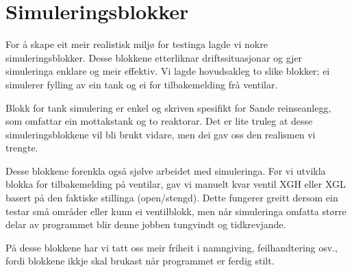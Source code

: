 \section{Simuleringsblokker}
\thispagestyle{fancy}

For å skape eit meir realistisk miljø for testinga lagde vi nokre simuleringsblokker.
Desse blokkene etterliknar driftssituasjonar og gjer simuleringa enklare og meir effektiv.
Vi lagde hovudsakleg to slike blokker; ei simulerer fylling av ein tank
og ei for tilbakemelding frå ventilar.

Blokk for tank simulering er enkel og skriven spesifikt for Sande reinseanlegg, som omfattar ein mottakstank
og to reaktorar.
Det er lite truleg at desse simuleringsblokkene vil bli brukt vidare, men dei gav
oss den realismen vi trengte.

Desse blokkene forenkla også sjølve arbeidet med simuleringa.
Før vi utvikla blokka for tilbakemelding på ventilar, 
gav vi manuelt kvar ventil \gls{XGH} eller \gls{XGL} basert på den faktiske stillinga (open/stengd).
Dette fungerer greitt dersom ein testar små områder eller kunn ei ventilblokk, men
når simuleringa omfatta større delar av programmet blir denne jobben tungvindt og tidkrevjande.

På desse blokkene har vi tatt oss meir friheit i namngiving, feilhandtering osv.,
fordi blokkene ikkje skal brukast når programmet er ferdig stilt.


